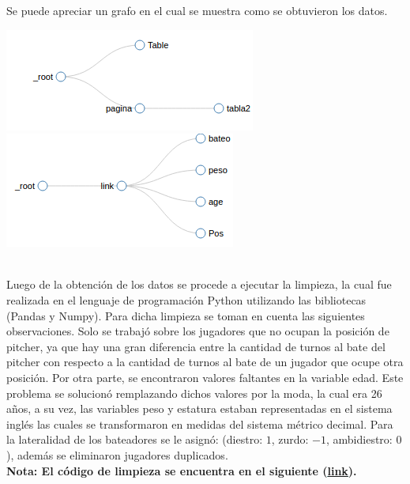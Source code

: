\documentclass[11pt,letterpaper]{report}
\begin{document}
  Se puede apreciar un grafo en el cual se muestra como se obtuvieron los datos. \\ 
  
\begin{center}
	\includegraphics[scale=0.8]{grafo1.png} \\ \vspace{3cm}
	\includegraphics[scale=0.8]{grafo2.png}
\end{center} 
\noindent \\  



 Luego de la obtención de los datos se procede a ejecutar la limpieza, la cual fue realizada en el lenguaje de programación Python utilizando las bibliotecas (Pandas y Numpy). Para dicha limpieza se toman en cuenta las siguientes observaciones. Solo se trabajó sobre los jugadores que no ocupan la posición de pitcher, ya que hay una gran diferencia entre la cantidad de turnos al bate del pitcher con respecto a la cantidad  de turnos al bate de un jugador que ocupe otra posición. Por otra parte, se encontraron valores faltantes en la variable edad. Este problema se solucionó remplazando dichos valores por la moda, la cual era 26 años, a su vez, las variables peso y estatura  estaban representadas en el sistema inglés las cuales se transformaron en medidas del sistema métrico decimal. Para la lateralidad de los bateadores se le asignó: (diestro: $1$, zurdo: $-1$, ambidiestro: $0$), además se eliminaron jugadores duplicados.\\
 
 \textbf{Nota: El código de limpieza se encuentra en el siguiente (\textcolor{cyan}{\underline{\href{https://github.com/jorge13flores/Proyecto-Final/blob/master/Limpieza.ipynb}{link}}}).} 
\end{document}
